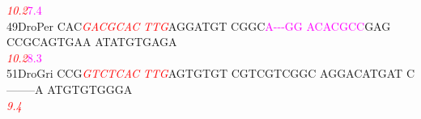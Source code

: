 \documentclass[11pt,twoside,reqno,a4paper]{article}
\begin{document}
{\hspace*{4\charwidth}\hspace*{7\charwidth}\hspace*{3\charwidth}\textit{\textcolor{red}{10.2}}\hspace*{1\charwidth}\hspace*{1\charwidth}\hspace*{17\charwidth}\textcolor{magenta}{7.4}\hspace*{1\charwidth}\hspace*{1\charwidth}\hspace*{1\charwidth}\hspace*{1\charwidth}\\
49\hspace*{2\charwidth}DroPer	CAC\textit{\textcolor{red}{G}}\textit{\textcolor{red}{A}}\textit{\textcolor{red}{C}}\textit{\textcolor{red}{G}}\textit{\textcolor{red}{C}}\textit{\textcolor{red}{A}}\textit{\textcolor{red}{C}}	\textit{\textcolor{red}{T}}\textit{\textcolor{red}{T}}\textit{\textcolor{red}{G}}AGGATGT	CGGC\textcolor{magenta}{A}\textcolor{magenta}{-}\textcolor{magenta}{-}\textcolor{magenta}{-}\textcolor{magenta}{G}\textcolor{magenta}{G}	\textcolor{magenta}{A}\textcolor{magenta}{C}\textcolor{magenta}{A}\textcolor{magenta}{C}\textcolor{magenta}{G}\textcolor{magenta}{C}\textcolor{magenta}{C}GAG	CCGCAGTGAA	ATATGTGAGA	\\
\hspace*{4\charwidth}\hspace*{7\charwidth}\hspace*{3\charwidth}\textit{\textcolor{red}{10.2}}\hspace*{1\charwidth}\hspace*{1\charwidth}\hspace*{17\charwidth}\textcolor{magenta}{8.3}\hspace*{1\charwidth}\hspace*{1\charwidth}\hspace*{1\charwidth}\hspace*{1\charwidth}\\
51\hspace*{2\charwidth}DroGri	CCG\textit{\textcolor{red}{G}}\textit{\textcolor{red}{T}}\textit{\textcolor{red}{C}}\textit{\textcolor{red}{T}}\textit{\textcolor{red}{C}}\textit{\textcolor{red}{A}}\textit{\textcolor{red}{C}}	\textit{\textcolor{red}{T}}\textit{\textcolor{red}{T}}\textit{\textcolor{red}{G}}AGTGTGT	CGTCGTCGGC	AGGACATGAT	C--------A	ATGTGTGGGA	\\
\hspace*{4\charwidth}\hspace*{7\charwidth}\hspace*{3\charwidth}\textit{\textcolor{red}{9.4}}\hspace*{1\charwidth}\hspace*{1\charwidth}\hspace*{1\charwidth}\hspace*{1\charwidth}\hspace*{1\charwidth}\hspace*{1\charwidth}\\
}
\end{document}
